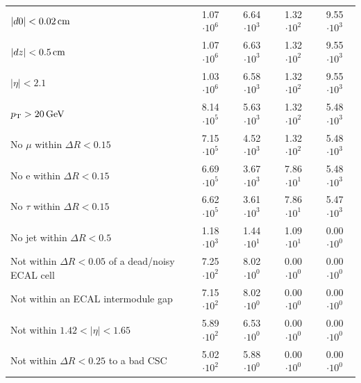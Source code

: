 \begin{table}[!h]
{\begin{tabular}{|l|c|c|c|c|}
$|d0|<0.02\,\text{cm}$                                                                            & 1.07 $\cdot10^{6 }$ & 6.64 $\cdot10^{3 }$ & 1.32 $\cdot10^{2 }$ & 9.55 $\cdot10^{3 }$ \\
$|dz|<0.5\,\text{cm}$                                                                             & 1.07 $\cdot10^{6 }$ & 6.63 $\cdot10^{3 }$ & 1.32 $\cdot10^{2 }$ & 9.55 $\cdot10^{3 }$ \\
$|\eta|<2.1$                                                                              & 1.03 $\cdot10^{6 }$ & 6.58 $\cdot10^{3 }$ & 1.32 $\cdot10^{2 }$ & 9.55 $\cdot10^{3 }$ \\
$p_{\text{T}}>20\,\text{Ge}\kern-0.06667em\text{V}$                                                                              & 8.14 $\cdot10^{5 }$ & 5.63 $\cdot10^{3 }$ & 1.32 $\cdot10^{2 }$ & 5.48 $\cdot10^{3 }$ \\
No $\mu$ within $\Delta R<0.15$                                                           & 7.15 $\cdot10^{5 }$ & 4.52 $\cdot10^{3 }$ & 1.32 $\cdot10^{2 }$ & 5.48 $\cdot10^{3 }$ \\
No e within $\Delta R<0.15$                                                               & 6.69 $\cdot10^{5 }$ & 3.67 $\cdot10^{3 }$ & 7.86 $\cdot10^{1 }$ & 5.48 $\cdot10^{3 }$ \\
No $\tau$ within $\Delta R<0.15$                                                          & 6.62 $\cdot10^{5 }$ & 3.61 $\cdot10^{3 }$ & 7.86 $\cdot10^{1 }$ & 5.47 $\cdot10^{3 }$ \\
No jet within $\Delta R<0.5$                                                              & 1.18 $\cdot10^{3 }$ & 1.44 $\cdot10^{1 }$ & 1.09 $\cdot10^{1 }$ & 0.00 $\cdot10^{0 }$ \\
\makecell[l]{Not within $\Delta R<0.05$ of \\\hfill a dead/noisy ECAL cell}               & 7.25 $\cdot10^{2 }$ & 8.02 $\cdot10^{0 }$ & 0.00 $\cdot10^{0 }$ & 0.00 $\cdot10^{0 }$ \\
Not within an ECAL  intermodule gap                                                       & 7.15 $\cdot10^{2 }$ & 8.02 $\cdot10^{0 }$ & 0.00 $\cdot10^{0 }$ & 0.00 $\cdot10^{0 }$ \\
Not within $1.42<|\eta|<1.65$                                                             & 5.89 $\cdot10^{2 }$ & 6.53 $\cdot10^{0 }$ & 0.00 $\cdot10^{0 }$ & 0.00 $\cdot10^{0 }$ \\
Not within $\Delta R<0.25$ to a bad CSC                                                   & 5.02 $\cdot10^{2 }$ & 5.88 $\cdot10^{0 }$ & 0.00 $\cdot10^{0 }$ & 0.00 $\cdot10^{0 }$ \\

\end{tabular}}
\end{table}
